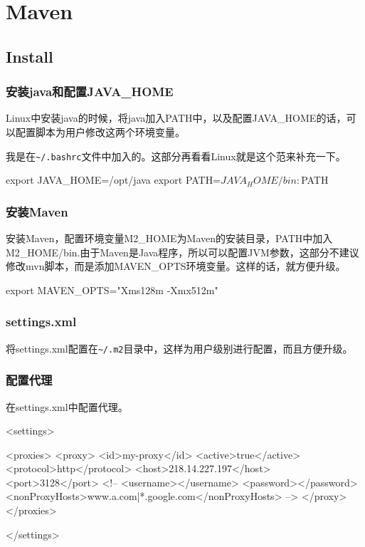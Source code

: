 \chapter{Maven}

\section{Install}

\subsection{安装java和配置JAVA\_HOME}

Linux中安装java的时候，将java加入PATH中，以及配置JAVA\_HOME的话，可以配置脚本为用户修改这两个环境变量。

我是在\lstinline$~/.bashrc$文件中加入的。这部分再看看Linux就是这个范来补充一下。

\begin{Bash}
export JAVA_HOME=/opt/java
export PATH=$JAVA_HOME/bin:$PATH
\end{Bash}

\subsection{安装Maven}

安装Maven，配置环境变量M2\_HOME为Maven的安装目录，PATH中加入M2\_HOME/bin.由于Maven是Java程序，所以可以配置JVM参数，这部分不建议修改mvn脚本，而是添加MAVEN\_OPTS环境变量。这样的话，就方便升级。

\begin{Bash}
export MAVEN_OPTS="Xms128m -Xmx512m"
\end{Bash}

\subsection{settings.xml}

将settings.xml配置在\lstinline$~/.m2$目录中，这样为用户级别进行配置，而且方便升级。


\subsection{配置代理}


在settings.xml中配置代理。

\begin{XML}

<settings>

	<proxies>
		<proxy>
			<id>my-proxy</id>
			<active>true</active>
			<protocol>http</protocol>
			<host>218.14.227.197</host>
			<port>3128</port>
			<!--
			<username></username>
			<password></password>
			<nonProxyHosts>www.a.com|*.google.com</nonProxyHosts>
			-->
		</proxy>
	</proxies>

</settings>

\end{XML}

